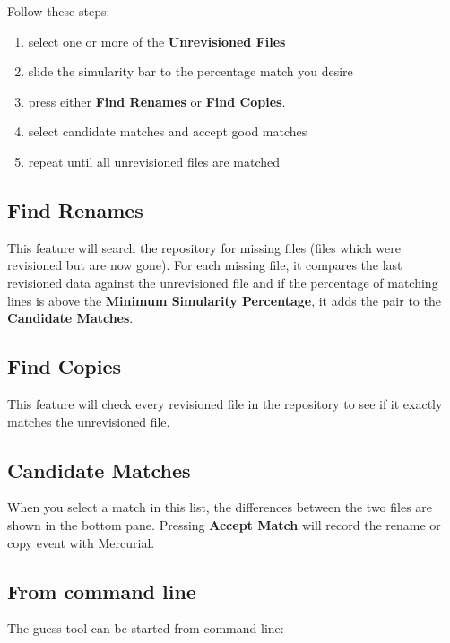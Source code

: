 \documentclass[letterpaper,10pt,english]{manual}
\begin{document}
Follow these steps:
\begin{enumerate}
\item {} 
select one or more of the \textbf{Unrevisioned Files}

\item {} 
slide the simularity bar to the percentage match you desire

\item {} 
press either \textbf{Find Renames} or \textbf{Find Copies}.

\item {} 
select candidate matches and accept good matches

\item {} 
repeat until all unrevisioned files are matched

\end{enumerate}


\subsection{Find Renames}

This feature will search the repository for missing files (files which
were revisioned but are now gone).  For each missing file, it compares
the last revisioned data against the unrevisioned file and if the
percentage of matching lines is above the
\textbf{Minimum Simularity Percentage}, it adds the pair to the
\textbf{Candidate Matches}.


\subsection{Find Copies}

This feature will check every revisioned file in the repository to see
if it exactly matches the unrevisioned file.


\subsection{Candidate Matches}

When you select a match in this list, the differences between the two
files are shown in the bottom pane.  Pressing \textbf{Accept Match}
will record the rename or copy event with Mercurial.


\subsection{From command line}

The guess tool can be started from command line:
\end{document}
